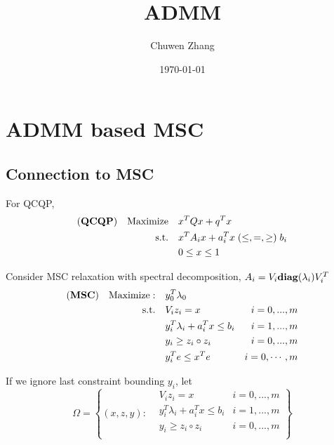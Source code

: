 \documentclass[../main]{subfiles}
\title{ADMM}
\author{Chuwen Zhang}
\date{\today}
\begin{document}
\maketitle
{
    \setcounter{tocdepth}{3}
    \tableofcontents
}
\section{ADMM based MSC}

\subsection{Connection to MSC}
For QCQP,
\begin{equation}\label{eq:inhoqcqp}
    \begin{aligned}
        (\textbf{QCQP}) \quad \mathrm{Maximize}\quad & x^TQx +q^T x                                     \\
        \mathrm{s.t.}  \quad                      & x^{T} A_i x  + a_i^Tx   \; (\le, =, \ge)  \; b_i \\
                                                  & 0 \le x\le  1
    \end{aligned}
\end{equation}

Consider MSC relaxation with spectral decomposition,
\(A_i = V_i \mathbf{diag} (\lambda_i) V_i^T\)
\begin{equation}\label{eq.rel.msc}
    \begin{aligned}
        (\textbf{MSC}) \quad \mathrm{Maximize: }\quad & y_0 ^T\lambda_0                                     \\
        \mathrm{s.t.} \quad                        & V_i z_i = x                        & i=0,...,m      \\
                                                   & y_i ^T\lambda_i  + a_i^Tx  \le b_i & i=1,...,m      \\
                                                   & y_i \ge z_i \circ z_i              & i=0,...,m      \\
                                                   & y_i^Te \le x^Te                    & i=0, \cdots, m
    \end{aligned}
\end{equation}

If we ignore last constraint bounding \(y_i\), let
\begin{equation}
    \Omega = \left\{ (x,z,y) :  \begin{aligned}
         & V_i z_i = x                        & i=0,...,m \\
         & y_i ^T\lambda_i  + a_i^Tx  \le b_i & i=1,...,m \\
         & y_i \ge z_i \circ z_i              & i=0,...,m \\
    \end{aligned}\right\}
\end{equation}
\end{document}
